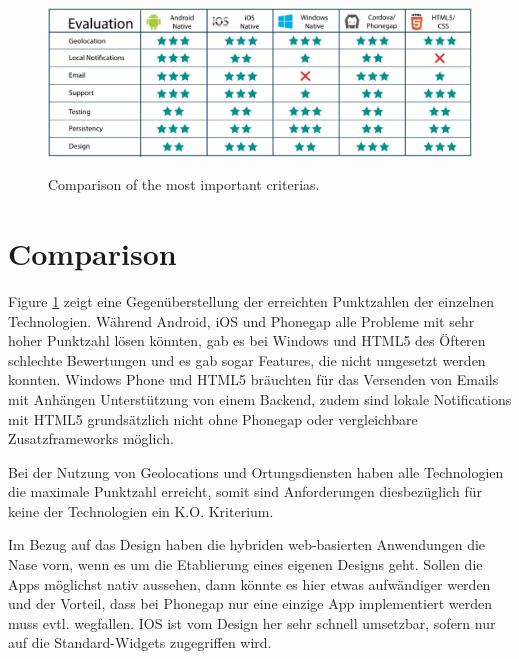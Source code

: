 \begin{figure}[t!]
\caption{Comparison of the most important criterias.}
\centering
\includegraphics[width=\textwidth]{resources/comparison.jpg}
\label{comparison}
\end{figure}

\section{Comparison}

Figure \ref{comparison} zeigt eine Gegenüberstellung der erreichten Punktzahlen der einzelnen Technologien. Während Android, iOS und Phonegap alle Probleme mit sehr hoher Punktzahl lösen könnten, gab es bei Windows und HTML5 des Öfteren schlechte Bewertungen und es gab sogar Features, die nicht umgesetzt werden konnten. Windows Phone und HTML5 bräuchten für das Versenden von Emails mit Anhängen Unterstützung von einem Backend, zudem sind lokale Notifications mit HTML5 grundsätzlich nicht ohne Phonegap oder vergleichbare Zusatzframeworks möglich.

Bei der Nutzung von Geolocations und Ortungsdiensten haben alle Technologien die maximale Punktzahl erreicht, somit sind Anforderungen diesbezüglich für keine der Technologien ein K.O. Kriterium.

Im Bezug auf das Design haben die hybriden web-basierten Anwendungen die Nase vorn, wenn es um die Etablierung eines eigenen Designs geht. Sollen die Apps möglichst nativ aussehen, dann könnte es hier etwas aufwändiger werden und der Vorteil, dass bei Phonegap nur eine einzige App implementiert werden muss evtl. wegfallen. IOS ist vom Design her sehr schnell umsetzbar, sofern nur auf die Standard-Widgets zugegriffen wird. 

